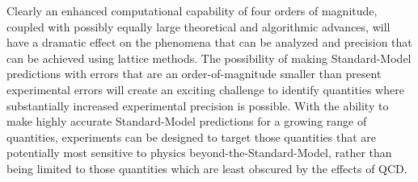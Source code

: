 Clearly an enhanced computational capability of four orders of magnitude,
coupled with possibly equally large theoretical and algorithmic advances, will
have a dramatic effect on the phenomena that can be analyzed and precision
that can be achieved using lattice methods.  The possibility of making
Standard-Model predictions with errors that are an order-of-magnitude smaller
than present experimental errors will create an exciting challenge to identify
quantities where substantially increased experimental precision is possible.
With the ability to make highly accurate Standard-Model predictions for a
growing range of quantities, experiments can be designed to target those
quantities that are potentially most sensitive to physics
beyond-the-Standard-Model, rather than being limited to those quantities which
are least obscured by the effects of QCD.
